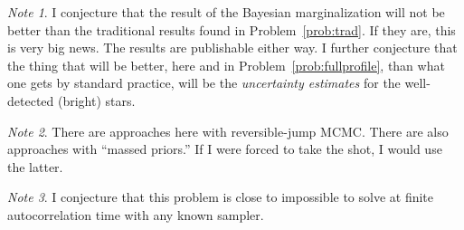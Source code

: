 \documentclass{article}
\theoremstyle{definition}
\newcommand{\problemname}{Problem}
\newcommand{\probref}[1]{\problemname~\ref{#1}}
\theoremstyle{remark}
\newcommand{\notename}{Note}
\newtheorem{note}{\notename}[problem]
\begin{document}
\begin{note}
I conjecture that the result of the Bayesian marginalization will not be better than the traditional results found in \probref{prob:trad}.
If they are, this is very big news.
The results are publishable either way.
I further conjecture that the thing that will be better, here and in \probref{prob:fullprofile}, than what one gets by standard practice, will be the \emph{uncertainty estimates} for the well-detected (bright) stars.
\end{note}

\begin{note}
There are approaches here with reversible-jump MCMC.
There are also approaches with ``massed priors.''
If I were forced to take the shot, I would use the latter.
\end{note}

\begin{note}
I conjecture that this problem is close to impossible to solve at finite autocorrelation time with any known sampler.
\end{note}
\end{document}
